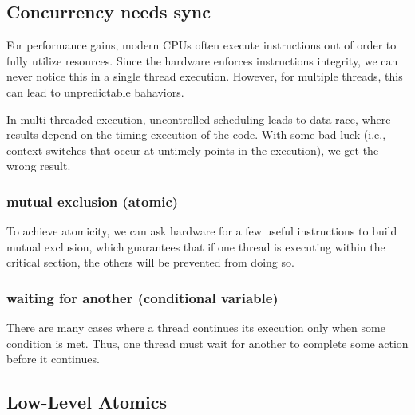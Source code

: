 \subsection{Concurrency needs sync }

For performance gains, modern CPUs often execute 
instructions out of order to fully utilize resources.
 Since the hardware enforces instructions integrity,
  we can never notice this in a single thread execution. 
  However, for multiple threads, this can lead to 
  unpredictable bahaviors.

In multi-threaded execution, uncontrolled scheduling leads 
to data race, where results depend on the timing execution 
of the code. With some bad luck (i.e., context switches 
that occur at untimely points in the execution), we get 
the wrong result.

\subsubsection{mutual exclusion (atomic)}
To achieve atomicity, we can ask hardware for a few useful instructions to build mutual exclusion, which guarantees that if one thread is executing within the critical section, the others will be prevented from doing so.

\subsubsection{ waiting for another (conditional variable)}
There are many cases where a thread continues its execution 
only when some condition is met. Thus, one thread must wait
 for another to complete some action before it continues. 

\subsection{Low-Level Atomics}

